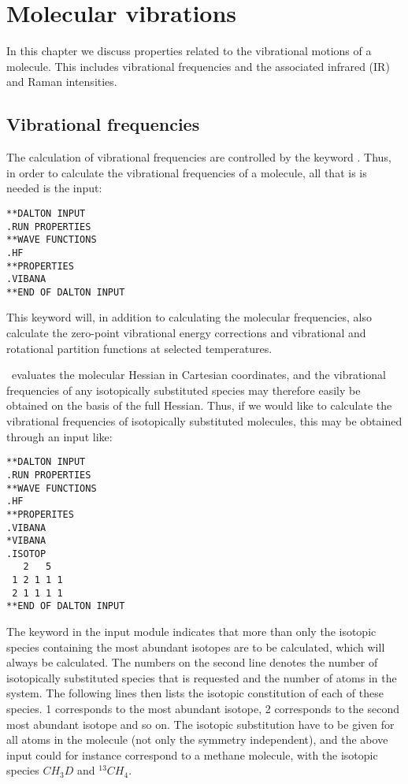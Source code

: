 \chapter{Molecular vibrations}\label{ch:vibrot}

In this chapter we discuss properties related  to the
vibrational motions of a molecule. This includes
vibrational frequencies and the associated infrared
(IR) and Raman intensities.

\section{Vibrational frequencies}\label{sec:vibfreq}

The calculation of vibrational frequencies are
controlled by the keyword . Thus, in order to
calculate the vibrational frequencies
of a molecule, all that is is needed is the input:

\begin{verbatim}
**DALTON INPUT
.RUN PROPERTIES
**WAVE FUNCTIONS
.HF
**PROPERTIES
.VIBANA
**END OF DALTON INPUT
\end{verbatim}

This keyword will, in addition to calculating the molecular
frequencies, also calculate the zero-point vibrational
energy corrections and vibrational
and rotational partition functions
at selected temperatures.

\dalton\ evaluates the molecular Hessian in Cartesian
coordinates, and
the vibrational frequencies of any isotopically substituted  species
may therefore easily be obtained on the basis of the full
Hessian. Thus, if we would like to calculate the vibrational
frequencies of isotopically substituted molecules, this may be obtained through an input like:

\begin{verbatim}
**DALTON INPUT
.RUN PROPERTIES
**WAVE FUNCTIONS
.HF
**PROPERITES
.VIBANA
*VIBANA
.ISOTOP
   2   5
 1 2 1 1 1
 2 1 1 1 1
**END OF DALTON INPUT
\end{verbatim}

The keyword  in the  input module
indicates that more than only the isotopic species containing the most
abundant isotopes are to be calculated, which will always be
calculated. The numbers on the second line denotes the number of
isotopically substituted species that is requested and the number of
atoms in the system. The following lines then
lists the isotopic constitution of each of these species. 1
corresponds to the most abundant isotope, 2 corresponds to the second
most abundant isotope and so on. The isotopic substitution have to be
given for all atoms in the molecule (not only the symmetry
independent), and the above input could for instance correspond to a
methane molecule, with the isotopic species $CH_3D$
and $^{13}CH_4$.

